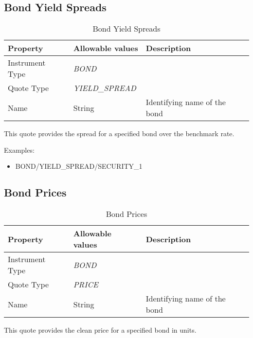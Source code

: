 \subsection{Bond Yield Spreads}

\begin{table}[H]
\centering
  \begin{tabular}{|p{3cm}|p{3.5cm}|p{7cm}|}
  \hline
  {\bf Property} & {\bf Allowable values} & {\bf Description} \\ \hline
    Instrument Type & \emph{BOND} & \\ \hline
    Quote Type & \emph{YIELD\_SPREAD} & \\ \hline
    Name & String & Identifying name of the bond \\ \hline
  \end{tabular}
  \caption{Bond Yield Spreads}
  \label{tab:bondyieldspread_quote}
\end{table}

This quote provides the spread for a specified bond over the benchmark rate.

\medskip
Examples:
\begin{itemize}
	\item BOND/YIELD\_SPREAD/SECURITY\_1
\end{itemize}

\subsection{Bond Prices}

\begin{table}[H]
\centering
  \begin{tabular}{|p{3cm}|p{3.5cm}|p{7cm}|}
  \hline
  {\bf Property} & {\bf Allowable values} & {\bf Description} \\ \hline
    Instrument Type & \emph{BOND} & \\ \hline
    Quote Type & \emph{PRICE} & \\ \hline
    Name & String & Identifying name of the bond \\ \hline
  \end{tabular}
  \caption{Bond Prices}
  \label{tab:bondprice_quote}
\end{table}

This quote provides the clean price for a specified bond in units.

